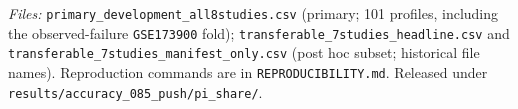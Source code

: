 \medskip
\noindent\textit{Files:}
\texttt{primary\_development\_all8studies.csv} (primary; 101 profiles,
including the observed-failure \texttt{GSE173900} fold);
\texttt{transferable\_7studies\_headline.csv} and
\texttt{transferable\_7studies\_manifest\_only.csv} (post hoc subset; historical
file names). Reproduction commands are in \texttt{REPRODUCIBILITY.md}. Released under
\texttt{results/accuracy\_085\_push/pi\_share/}.


